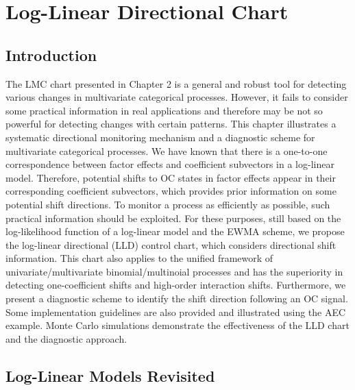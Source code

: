 \chapter{Log-Linear Directional Chart}\label{chp3}

\section{Introduction}\label{sec3.1}

The LMC chart presented in Chapter 2 is a general and robust tool for detecting
various changes in multivariate categorical processes. However, it fails to consider
some practical information in real applications and therefore may be not so powerful
for detecting changes with certain patterns. This chapter illustrates a systematic
directional monitoring mechanism and a diagnostic scheme for multivariate
categorical processes. We have known that there is a one-to-one correspondence
between factor effects and coefficient subvectors in a log-linear model. Therefore,
potential shifts to OC states in factor effects appear in their corresponding
coefficient subvectors, which provides prior information on some potential shift
directions. To monitor a process as efficiently as possible, such practical
information should be exploited. For these purposes, still based on the
log-likelihood function of a log-linear model and the EWMA scheme, we propose the
log-linear directional (LLD) control chart, which considers directional shift
information. This chart also applies to the unified framework of
univariate/multivariate binomial/multinoial processes and has the superiority in
detecting one-coefficient shifts and high-order interaction shifts. Furthermore, we
present a diagnostic scheme to identify the shift direction following an OC signal.
Some implementation guidelines are also provided and illustrated using the AEC
example. Monte Carlo simulations demonstrate the effectiveness of the LLD chart and
the diagnostic approach.



\section{Log-Linear Models Revisited}\label{sec3.2}


